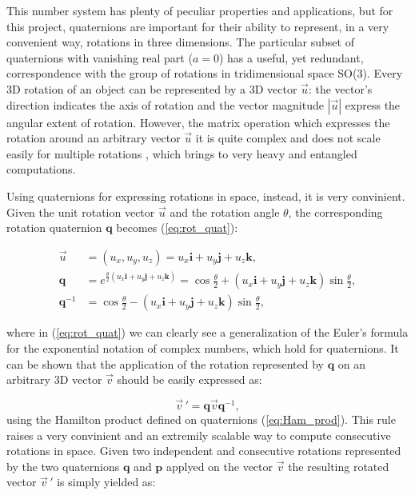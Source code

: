 \documentclass[12pt,a4paper]{report}
\begin{document}
    This number system has plenty of peculiar properties and applications, but for this project, quaternions are important for their ability to represent, in a very convenient way, rotations in three dimensions. The particular subset of quaternions with vanishing real part ($a=0$) has a useful, yet redundant, correspondence with the group of rotations in tridimensional space SO(3). Every 3D rotation of an object can be represented by a 3D vector $\vec u$: the vector's direction indicates the axis of rotation and the vector magnitude $|\vec u|$ express the angular extent of rotation. However, the matrix operation which expresses the rotation around an arbitrary vector $\vec u$ it is quite complex and does not scale easily for multiple rotations \cite{10.1007/BFb0031048}, which brings to very heavy and entangled computations.

    Using quaternions for expressing rotations in space, instead, it is very convinient. Given the unit rotation vector $\vec u$ and the rotation angle $\theta$, the corresponding rotation quaternion $\bm{q}$ becomes (\ref{eq:rot_quat}):

    \begin{align}
        \vec u & = (u_x, u_y, u_z) = u_x\bm{i} + u_y\bm{j} + u_z\bm{k}, \\
        \bm{q} & = e^{\frac{\theta}{2}(u_x\bm{i} + u_y\bm{j} + u_z\bm{k})} = \cos{\frac{\theta}{2}} + (u_x\bm{i} + u_y\bm{j} + u_z\bm{k})\sin{\frac{\theta}{2}}, \label{eq:rot_quat}\\
        \bm{q}^{-1} & = \cos{\frac{\theta}{2}} - (u_x\bm{i} + u_y\bm{j} + u_z\bm{k})\sin{\frac{\theta}{2}},
    \end{align}

    where in (\ref{eq:rot_quat}) we can clearly see a generalization of the Euler's formula for the exponential notation of complex numbers, which hold for quaternions. It can be shown that the application of the rotation represented by $\bm{q}$ on an arbitrary 3D vector $\vec v$ should be easily expressed as:

    \begin{equation}
        \vec v\,' = \bm{q} \vec v \bm{q}^{-1},
    \end{equation}
    using the Hamilton product defined on quaternions (\ref{eq:Ham_prod}). This rule raises a very convinient and an extremily scalable way to compute consecutive rotations in space. Given two independent and consecutive rotations represented by the two quaternions $\bm{q}$ and $\bm{p}$ applyed on the vector $\vec v$ the resulting rotated vector $\vec v\,'$ is simply yielded as:
\end{document}
